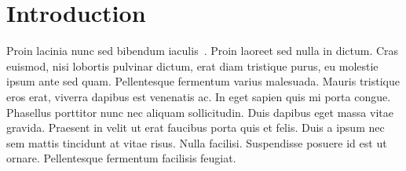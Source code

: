 \section{Introduction}\label{sec:intro}
Proin lacinia nunc sed bibendum iaculis~\cite{turing1960}.
Proin laoreet sed nulla in dictum.
Cras euismod, nisi lobortis pulvinar dictum, erat diam tristique purus, eu molestie ipsum ante sed quam.
Pellentesque fermentum varius malesuada.
Mauris tristique eros erat, viverra dapibus est venenatis ac.
In eget sapien quis mi porta congue.
Phasellus porttitor nunc nec aliquam sollicitudin.
Duis dapibus eget massa vitae gravida.
Praesent in velit ut erat faucibus porta quis et felis.
Duis a ipsum nec sem mattis tincidunt at vitae risus.
Nulla facilisi.
Suspendisse posuere id est ut ornare.
Pellentesque fermentum facilisis feugiat.
